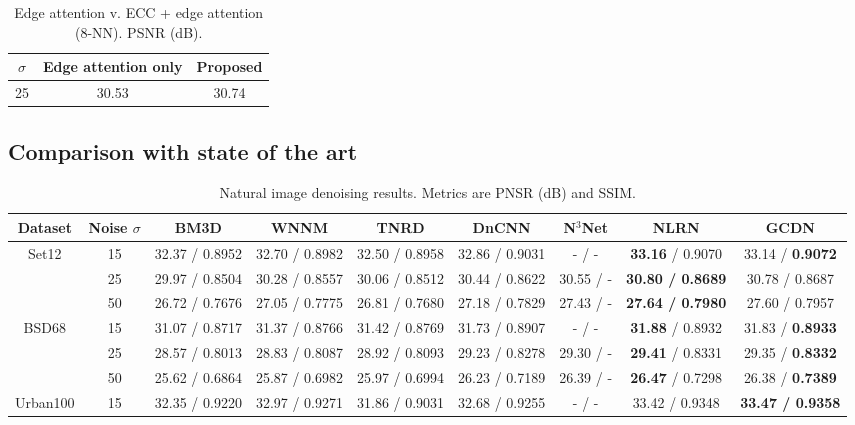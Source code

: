 \documentclass[journal]{IEEEtran}
\begin{document}
\begin{table}
\centering
\caption{Edge attention v. ECC + edge attention (8-NN). PSNR (dB).}
\begin{tabular}{ccc}
\hline
$\sigma$ & Edge attention only & Proposed \\ \hline
25       & 30.53 & 30.74 \\ \hline
\end{tabular}
\label{table:onlyscalar}
\end{table}


\subsection{Comparison with state of the art}

\begin{table*}[t]
\centering
\caption{Natural image denoising results. Metrics are PNSR (dB) and SSIM.}
\begin{tabular}{ccccccccc}
\hline
Dataset                   & Noise $\sigma$ & BM3D           & WNNM           & TNRD           & DnCNN          & N$^3$Net  & NLRN                    & \textbf{GCDN}       \\ \hline
\multirow{3}{*}{Set12}    & 15             & 32.37 / 0.8952 & 32.70 / 0.8982 & 32.50 / 0.8958 & 32.86 / 0.9031 & - / -     & \textbf{33.16} / 0.9070 & 33.14 / \textbf{0.9072}         \\
                          & 25             & 29.97 / 0.8504 & 30.28 / 0.8557 & 30.06 / 0.8512 & 30.44 / 0.8622 & 30.55 / - & \textbf{30.80 / 0.8689} & 30.78 / 0.8687          \\
                          & 50             & 26.72 / 0.7676 & 27.05 / 0.7775 & 26.81 / 0.7680 & 27.18 / 0.7829 & 27.43 / - & \textbf{27.64 / 0.7980} & 27.60 / 0.7957          \\ \hline
\multirow{3}{*}{BSD68}    & 15             & 31.07 / 0.8717 & 31.37 / 0.8766 & 31.42 / 0.8769 & 31.73 / 0.8907 & - / -     & \textbf{31.88} / 0.8932 & 31.83 / \textbf{0.8933}          \\ 
                          & 25             & 28.57 / 0.8013 & 28.83 / 0.8087 & 28.92 / 0.8093 & 29.23 / 0.8278 & 29.30 / - & \textbf{29.41} / 0.8331 & 29.35 / \textbf{0.8332} \\ 
                          & 50             & 25.62 / 0.6864 & 25.87 / 0.6982 & 25.97 / 0.6994 & 26.23 / 0.7189 & 26.39 / - & \textbf{26.47} / 0.7298 & 26.38 / \textbf{0.7389}          \\ \hline
\multirow{3}{*}{Urban100} & 15             & 32.35 / 0.9220 & 32.97 / 0.9271 & 31.86 / 0.9031 & 32.68 / 0.9255 & - / -     & 33.42 / 0.9348          & \textbf{33.47 / 0.9358} \\ 

\end{tabular}
\end{table*}
\end{document}

